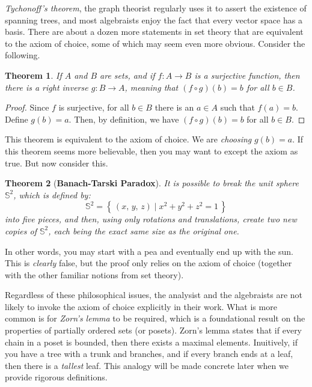 \documentclass{article}
\newtheorem{theorem}{Theorem}[section]
\theoremstyle{definition}
\begin{document}
        \textit{Tychonoff's theorem}, the graph theorist regularly
        uses it to assert the existence of spanning trees, and most algebraists
        enjoy the fact that every vector space has a basis. There are about
        a dozen more statements in set theory that are equivalent to the
        axiom of choice, some of which may seem even more obvious. Consider
        the following.
        \begin{theorem}
            If $A$ and $B$ are sets, and if $f:A\rightarrow{B}$ is a
            surjective function, then there is a \textit{right inverse}
            $g:B\rightarrow{A}$, meaning that $(f\circ{g})(b)=b$ for all
            $b\in{B}$.
        \end{theorem}
        \begin{proof}
            Since $f$ is surjective, for all $b\in{B}$ there is an $a\in{A}$
            such that $f(a)=b$. Define $g(b)=a$. Then, by definition, we have
            $(f\circ{g})(b)=b$ for all $b\in{B}$.
        \end{proof}
        This theorem is equivalent to the axiom of choice. We are
        \textit{choosing} $g(b)=a$. If this theorem seems more believable,
        then you may want to except the axiom as true. But now consider this.
        \begin{theorem}[\textbf{Banach-Tarski Paradox}]
            It is possible to break the unit sphere $\mathbb{S}^{2}$, which
            is defined by:
            \begin{equation}
                \mathbb{S}^{2}
                =\left\{\,(x,\,y,\,z)\;\big|\;x^{2}+y^{2}+z^{2}=1\,\right\}
            \end{equation}
            into five pieces, and then, using only rotations and translations,
            create two new copies of $\mathbb{S}^{2}$, each being the exact
            same size as the original one.
        \end{theorem}
        In other words, you may start with a pea and eventually end up with
        the sun. This is \textit{clearly} false, but the proof only relies on
        the axiom of choice (together with the other familiar notions from
        set theory).
        \par\hfill\par
        Regardless of these philosophical issues, the analysist and the
        algebraists are not likely to invoke the axiom of choice explicitly
        in their work. What is more common is for \textit{Zorn's lemma} to
        be required, which is a foundational result on the properties of
        partially ordered sets (or posets). Zorn's lemma states that if every
        chain in a poset is bounded, then there exists a maximal elements.
        Inuitively, if you have a tree with a trunk and branches, and if
        every branch ends at a leaf, then there is a \textit{tallest} leaf.
        This analogy will be made concrete later when we provide rigorous
        definitions.
\end{document}
